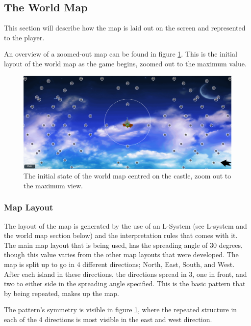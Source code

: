 \subsection{The World Map}
This section will describe how the map is laid out on the screen and represented to the player.

An overview of a zoomed-out map can be found in figure \ref{fig:worldmapzoom}. This is the initial layout of the world map as the game begins, zoomed out to the maximum value.

\begin{figure}[!ht]
    \centering
    \includegraphics[width=\textwidth]{Images/WorldMapZoom.png}
    \caption{The initial state of the world map centred on the castle, zoom out to the maximum view.}
    \label{fig:worldmapzoom}
\end{figure}

\subsubsection{Map Layout}
The layout of the map is generated by the use of an L-System (see L-system and the world map section below) and the interpretation rules that comes with it. The main map layout that is being used, has the spreading angle of 30 degrees, though this value varies from the other map layouts that were developed. The map is split up to go in 4 different directions; North, East, South, and West. After each island in these directions, the directions spread in 3, one in front, and two to either side in the spreading angle specified. This is the basic pattern that by being repeated, makes up the map.

The pattern's symmetry is visible in figure \ref{fig:worldmapzoom}, where the repeated structure in each of the 4 directions is most visible in the east and west direction.

